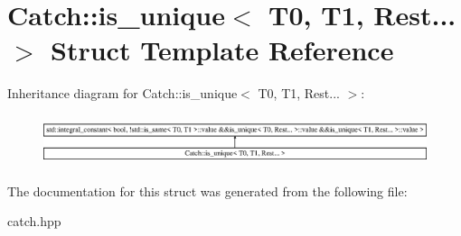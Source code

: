 \hypertarget{structCatch_1_1is__unique_3_01T0_00_01T1_00_01Rest_8_8_8_01_4}{}\section{Catch\+::is\+\_\+unique$<$ T0, T1, Rest... $>$ Struct Template Reference}
\label{structCatch_1_1is__unique_3_01T0_00_01T1_00_01Rest_8_8_8_01_4}
Inheritance diagram for Catch\+::is\+\_\+unique$<$ T0, T1, Rest... $>$\+:\begin{figure}[H]
\begin{center}
\leavevmode
\includegraphics[height=1.483444cm]{structCatch_1_1is__unique_3_01T0_00_01T1_00_01Rest_8_8_8_01_4}
\end{center}
\end{figure}


The documentation for this struct was generated from the following file\+:\begin{DoxyCompactItemize}
\item 
catch.\+hpp\end{DoxyCompactItemize}
